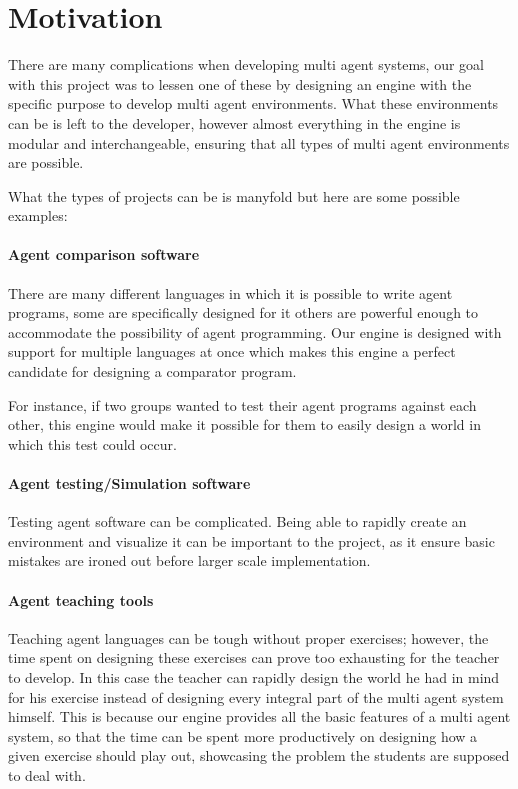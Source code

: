 
\section{Motivation}

There are many complications when developing multi agent systems,
our goal with this project was to lessen one of these by designing
an engine with the specific purpose to develop multi agent environments.
What these environments can be is left to the developer, however almost
everything in the engine is modular and interchangeable, ensuring
that all types of multi agent environments are possible. 

What the types of projects can be is manyfold but here are some possible
examples:


\paragraph*{Agent comparison software }

There are many different languages in which it is possible to write
agent programs, some are specifically designed for it others are powerful
enough to accommodate the possibility of agent programming. Our engine
is designed with support for multiple languages at once which makes
this engine a perfect candidate for designing a comparator program. 

For instance, if two groups wanted to test their agent programs against
each other, this engine would make it possible for them to easily
design a world in which this test could occur.


\paragraph*{Agent testing/Simulation software}

Testing agent software can be complicated. Being able to rapidly create
an environment and visualize it can be important to the project, as
it ensure basic mistakes are ironed out before larger scale implementation. 


\paragraph*{Agent teaching tools}

Teaching agent languages can be tough without proper exercises; however,
the time spent on designing these exercises can prove too exhausting
for the teacher to develop. In this case the teacher can rapidly design
the world he had in mind for his exercise instead of designing every
integral part of the multi agent system himself. This is because our
engine provides all the basic features of a multi agent system, so
that the time can be spent more productively on designing how a given
exercise should play out, showcasing the problem the students are
supposed to deal with.


